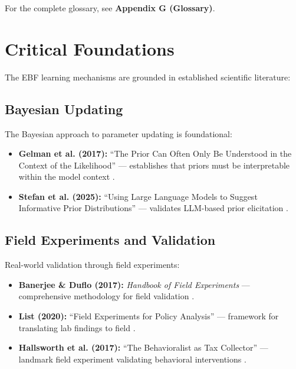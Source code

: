 For the complete glossary, see \textbf{Appendix G (Glossary)}.


\section{Critical Foundations}
\label{sec:ref-ebf-foundations}

The EBF learning mechanisms are grounded in established scientific literature:

\subsection{Bayesian Updating}

The Bayesian approach to parameter updating is foundational:
\begin{itemize}[nosep]
\item \textbf{Gelman et al. (2017):} ``The Prior Can Often Only Be Understood
      in the Context of the Likelihood'' --- establishes that priors must be
      interpretable within the model context \citep{gelman2017prior}.
\item \textbf{Stefan et al. (2025):} ``Using Large Language Models to Suggest
      Informative Prior Distributions'' --- validates LLM-based prior
      elicitation \citep{scientificreports2025llmpriors}.
\end{itemize}

\subsection{Field Experiments and Validation}

Real-world validation through field experiments:
\begin{itemize}[nosep]
\item \textbf{Banerjee \& Duflo (2017):} \textit{Handbook of Field Experiments}
      --- comprehensive methodology for field validation \citep{banerjee2017handbook}.
\item \textbf{List (2020):} ``Field Experiments for Policy Analysis'' ---
      framework for translating lab findings to field \citep{list2020field}.
\item \textbf{Hallsworth et al. (2017):} ``The Behavioralist as Tax Collector''
      --- landmark field experiment validating behavioral interventions
      \citep{hallsworth2017behavioralist}.
\end{itemize}

